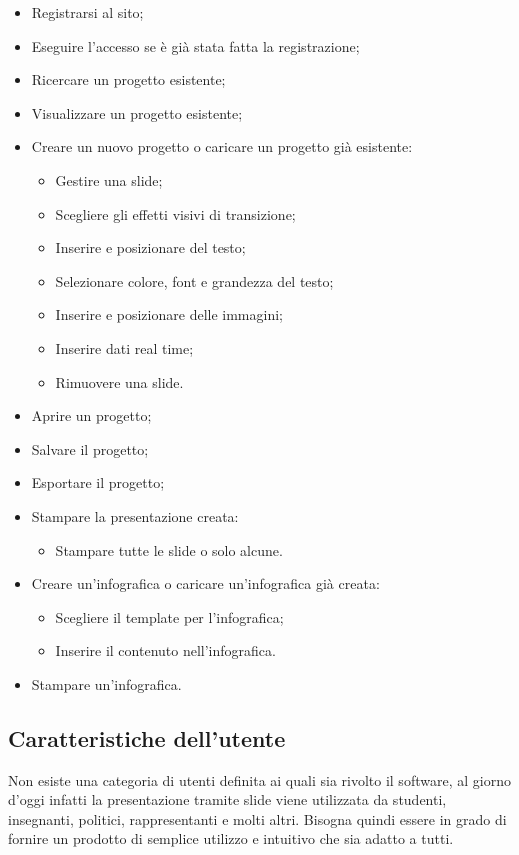 \begin{itemize}
	\item Registrarsi al sito;
	\item Eseguire l'accesso se è già stata fatta la registrazione;
	\item Ricercare un progetto esistente;
	\item Visualizzare un progetto esistente;
	\item Creare un nuovo progetto o caricare un progetto già esistente:
	\begin{itemize}
		\item Gestire una \gls{slide};
		\item Scegliere gli effetti visivi di transizione;
		\item Inserire e posizionare del testo;
		\item Selezionare colore, \gls{font} e grandezza del testo;
		\item Inserire e posizionare delle immagini;
		\item Inserire dati \gls{real time};
		\item Rimuovere una \gls{slide}.
	\end{itemize}
	\item Aprire un progetto;
	\item Salvare il progetto;
	\item Esportare il progetto;
	\item Stampare la presentazione creata:
	\begin{itemize}
		\item Stampare tutte le \gls{slide} o solo alcune.
	\end{itemize}
	\item Creare un'\gls{infografica} o caricare un'\gls{infografica} già creata:
	\begin{itemize}
		\item Scegliere il \gls{template} per l'\gls{infografica};
		\item Inserire il contenuto nell'\gls{infografica}.
	\end{itemize}
	\item Stampare un'\gls{infografica}.
\end{itemize}

\subsection{Caratteristiche dell'utente}
Non esiste una categoria di utenti definita ai quali sia rivolto il software, al giorno d'oggi infatti la presentazione tramite \gls{slide} viene utilizzata da studenti, insegnanti, politici, rappresentanti e molti altri. Bisogna quindi essere in grado di fornire un prodotto di semplice utilizzo e intuitivo che sia adatto a tutti.

